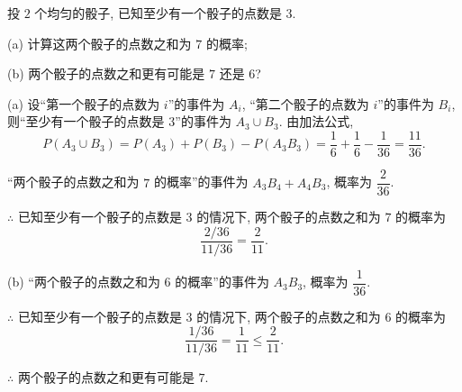 \documentclass[color=black,device=normal,lang=cn]{elegantnote}
\numberwithin{equation}{section}
\theoremstyle{plain}
\numberwithin{exercise}{exsection}
\begin{document}
\begin{exercise}%
    投 $2$ 个均匀的骰子, 已知至少有一个骰子的点数是 $3$.

    (a) 计算这两个骰子的点数之和为 $7$ 的概率;
    
    (b) 两个骰子的点数之和更有可能是 $7$ 还是 $6$?
\end{exercise}
\begin{solution}
    (a) 设``第一个骰子的点数为 $i$''的事件为 $A_i$, ``第二个骰子的点数为 $i$''的事件为 $B_i$, 则``至少有一个骰子的点数是 $3$''的事件为 $A_3\cup B_3$. 由加法公式,
    \[P(A_3\cup B_3)=P(A_3)+P(B_3)-P(A_3B_3)=\dfrac{1}{6}+\dfrac{1}{6}-\dfrac{1}{36}=\dfrac{11}{36}.\]

    ``两个骰子的点数之和为 $7$ 的概率''的事件为 $A_3B_4+A_4B_3$, 概率为 $\dfrac{2}{36}$.

    $\therefore$ 已知至少有一个骰子的点数是 $3$ 的情况下, 两个骰子的点数之和为 $7$ 的概率为
    \[\dfrac{2/36}{11/36}=\dfrac{2}{11}.\]

    (b) ``两个骰子的点数之和为 $6$ 的概率''的事件为 $A_3B_3$, 概率为 $\dfrac{1}{36}$.

    $\therefore$ 已知至少有一个骰子的点数是 $3$ 的情况下, 两个骰子的点数之和为 $6$ 的概率为
    \[\dfrac{1/36}{11/36}=\dfrac{1}{11}\leq\dfrac{2}{11}.\]
    
    $\therefore$ 两个骰子的点数之和更有可能是 $7$.
\end{solution}
\end{document}
